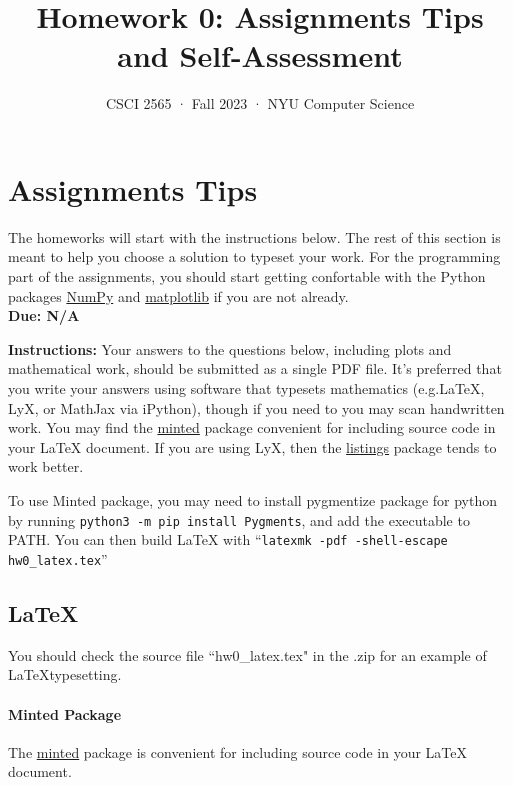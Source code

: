 \documentclass[12pt]{article}
\date{}
\begin{document}
 

\title{Homework 0: Assignments Tips and Self-Assessment}
\author{
CSCI 2565 · Fall 2023 · NYU Computer Science}

\maketitle
\section{Assignments Tips}

The homeworks will start with the instructions below. The rest of this section is meant to help you choose a solution to typeset your work. For the programming part of the assignments, you should start getting confortable with the Python packages \href{https://numpy.org/}{NumPy} and \href{https://matplotlib.org/}{matplotlib} if you are not already.
\\

\textbf{Due: N/A}

\textbf{Instructions: }Your answers to the questions below, including plots and mathematical
 work, should be submitted as a single PDF file.  It's preferred that you write your answers using software that typesets mathematics (e.g.LaTeX, LyX, or MathJax via iPython), though if you need to you may scan handwritten work.  You may find the \href{https://github.com/gpoore/minted}{minted} package convenient for including source code in your LaTeX document. If you are using LyX, then the \href{https://en.wikibooks.org/wiki/LaTeX/Source_Code_Listings}{listings} package tends to work better.

To use Minted package, you may need to install pygmentize package for python by running \texttt{python3 -m pip install Pygments}, and add the executable to PATH. You can then build LaTeX with ``\texttt{latexmk -pdf -shell-escape hw0\_latex.tex}''

\subsection{\LaTeX}
You should check the source file ``hw0\_latex.tex" in the .zip for an example of \LaTeX typesetting.

\paragraph{Minted Package}
The \href{https://github.com/gpoore/minted}{minted} package is convenient for including source code in your LaTeX document.
\end{document}
